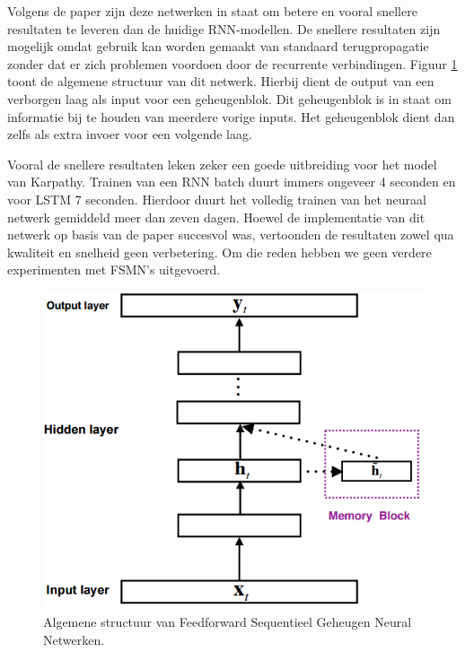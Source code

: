 Volgens de paper zijn deze netwerken in staat om betere en vooral snellere resultaten te leveren dan de huidige RNN-modellen. De snellere resultaten zijn mogelijk omdat gebruik kan worden gemaakt van standaard terugpropagatie zonder dat er zich problemen voordoen door de recurrente verbindingen. Figuur \ref{fig:fsmn} toont de  algemene structuur van dit netwerk. Hierbij dient de output van een verborgen laag als input voor een geheugenblok. Dit geheugenblok is in staat om informatie bij te houden van meerdere vorige inputs. Het geheugenblok dient dan zelfs als extra invoer voor een volgende laag.

Vooral de snellere resultaten leken zeker een goede uitbreiding voor het model van Karpathy. Trainen van een RNN batch duurt immers ongeveer 4 seconden en voor LSTM 7 seconden. Hierdoor duurt het volledig trainen van het neuraal netwerk gemiddeld meer dan zeven dagen.
Hoewel de implementatie van dit netwerk op basis van de paper succesvol was, vertoonden de resultaten zowel qua kwaliteit en snelheid geen verbetering. Om die reden hebben we geen verdere experimenten met FSMN's uitgevoerd.

\begin{figure}[tb]
	\centering
	\includegraphics[width=0.6\linewidth]{Images/FSMN}
	\caption{Algemene structuur van Feedforward Sequentieel Geheugen Neural Netwerken.}
	\label{fig:fsmn}
\end{figure}
